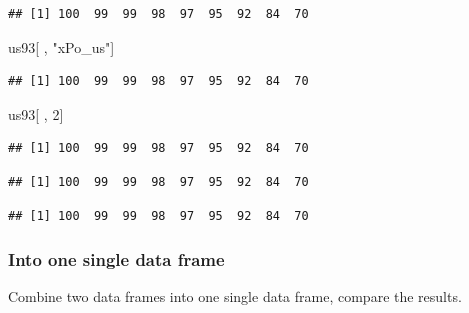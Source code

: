 \documentclass[
]{article}
\newenvironment{Shaded}{\begin{snugshade}}{\end{snugshade}}
\newcommand{\DecValTok}[1]{\textcolor[rgb]{0.00,0.00,0.81}{#1}}
\newcommand{\NormalTok}[1]{#1}
\newcommand{\SpecialCharTok}[1]{\textcolor[rgb]{0.00,0.00,0.00}{#1}}
\newcommand{\StringTok}[1]{\textcolor[rgb]{0.31,0.60,0.02}{#1}}
\begin{document}
\begin{verbatim}
## [1] 100  99  99  98  97  95  92  84  70
\end{verbatim}

\begin{Shaded}
\begin{Highlighting}[]
\NormalTok{us93[ , }\StringTok{"xPo\_us"}\NormalTok{]}
\end{Highlighting}
\end{Shaded}

\begin{verbatim}
## [1] 100  99  99  98  97  95  92  84  70
\end{verbatim}

\begin{Shaded}
\begin{Highlighting}[]
\NormalTok{us93[ , }\DecValTok{2}\NormalTok{]}
\end{Highlighting}
\end{Shaded}

\begin{verbatim}
## [1] 100  99  99  98  97  95  92  84  70
\end{verbatim}

\begin{Shaded}
\end{Shaded}

\begin{verbatim}
## [1] 100  99  99  98  97  95  92  84  70
\end{verbatim}

\begin{Shaded}
\end{Shaded}

\begin{verbatim}
## [1] 100  99  99  98  97  95  92  84  70
\end{verbatim}

\hypertarget{into-one-single-data-frame}{%
\subsubsection{Into one single data
frame}\label{into-one-single-data-frame}}

Combine two data frames into one single data frame, compare the results.
\end{document}
